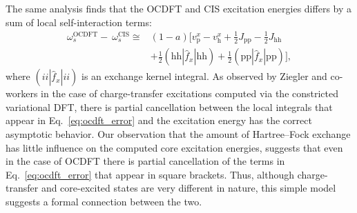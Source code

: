 \documentclass[8.5pt,twoside,twocolumn]{article}
\begin{document}
The same analysis finds that the OCDFT and CIS excitation energies differs by a sum of  local self-interaction terms:
\begin{align}
\nonumber
\omega^{\text{OCDFT}}_s - \ \omega^{\text{CIS}}_s  \cong &(1 - a) [v_{\text{p}}^x - v_{\text{h}}^x + \frac{1}{2} J_{\text{pp}} - \frac{1}{2} J_{\text{hh}} \\
\label{eq:ocdft_error}
&+ \frac{1}{2} (\text{hh}|\hat{f}_x|\text{hh}) +\frac{1}{2} (\text{pp}|\hat{f}_x|\text{pp})] ,
\end{align}
where $(ii|\hat{f}_x|ii)$
is an exchange kernel integral.
As observed by Ziegler and co-workers in the case of charge-transfer excitations computed via the constricted variational DFT,\cite{ziegler_implementation_2012} there is partial cancellation between the local integrals that appear in Eq.~\eqref{eq:ocdft_error} and the  excitation energy has the correct asymptotic behavior.
Our observation that the amount of Hartree--Fock exchange has little influence on the computed core excitation energies, suggests that even in the case of OCDFT there is partial cancellation of the terms in Eq.~\eqref{eq:ocdft_error} that appear in square brackets.
Thus, although charge-transfer and core-excited states are very different in nature, this simple model suggests a formal connection between the two.
\end{document}
